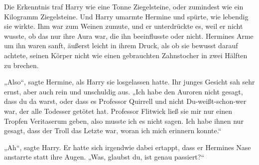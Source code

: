 Die Erkenntnis traf Harry wie eine Tonne Ziegelsteine, oder zumindest wie ein Kilogramm Ziegelsteine.
Und Harry umarmte Hermine und spürte, wie lebendig sie wirkte. Ihm war zum Weinen zumute, und er unterdrückte es, weil er nicht wusste, ob das nur ihre Aura war, die ihn beeinflusste oder nicht.
Hermines Arme um ihn waren sanft, äußerst leicht in ihrem Druck, als ob sie bewusst darauf achtete, seinen Körper nicht wie einen gebrauchten Zahnstocher in zwei Hälften zu brechen.

„Also“, sagte Hermine, als Harry sie losgelassen hatte. Ihr junges Gesicht sah sehr ernst, aber auch rein und unschuldig aus. „Ich habe den Auroren nicht gesagt, dass du da warst, oder dass es Professor Quirrell und nicht Du-weißt-schon-wer war, der alle Todesser getötet hat. Professor Flitwick ließ sie mir nur einen Tropfen Veritaserum geben, also musste ich es nicht sagen. Ich habe ihnen nur gesagt, dass der Troll das Letzte war, woran ich mich erinnern konnte.“

„Ah“, sagte Harry. Er hatte sich irgendwie dabei ertappt, dass er Hermines Nase anstarrte statt ihre Augen. „Was, glaubst du, ist genau passiert?“

